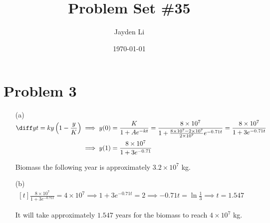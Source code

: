 \documentclass[preview, margin=0.6in]{standalone}
\title{\vspace*{-30pt}Problem Set \#35}
\author{Jayden Li}
\date{\today}
\newcommand*{\problem}[1]{\section*{Problem #1}}
\begin{document}
\fontsize{12pt}{12pt}\selectfont
\setlength{\abovedisplayskip}{0pt}
\setlength{\parindent}{0pt}
\setlength{\parskip}{2ex plus 0.5ex minus 0.2ex}
\maketitle
\problem{3}
\begin{itemize}
	\item[(a)]
		$\begin{aligned}[t]
			\diff yt=ky \left(1-\frac yK\right)
			&\implies y(0)=\frac{K}{1+Ae^{-kt}}
			=\frac{8\times10^7}{1+\frac{8\times 10^7-2\times10^7}{2\times10^7}e^{-0.71t}}
			=\frac{8\times10^7}{1+3e^{-0.71t}} \\
			&\implies y(1)=\frac{8\times10^7}{1+3e^{-0.71}}
		\end{aligned}$

		Biomass the following year is approximately $3.2\times10^7$ kg.

	\item[(b)]
		$\begin{aligned}[t]
		    \frac{8\times10^7}{1+3e^{-0.71t}}=4\times 10^7
			\implies 1+3e^{-0.71t}=2
			\implies -0.71t=\ln\frac13
			\implies t=1.547
		\end{aligned}$

		It will take approximately $1.547$ years for the biomass to reach $4\times 10^7$ kg.
\end{itemize}
\end{document}
